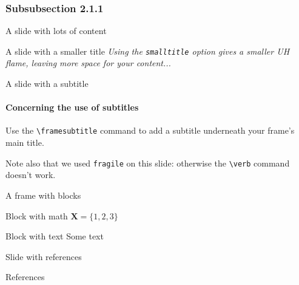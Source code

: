 \documentclass[12pt, t]{beamer}
\begin{document}
\subsubsection{Subsubsection 2.1.1}

\begin{frame}{A slide with lots of content}
    \lipsum[2]
\end{frame}

\begin{frame}[smalltitle]{A slide with a smaller title}
  \textit{Using the \texttt{smalltitle} option gives a smaller UH flame,
  leaving more space for your content...}

  \vspace{10pt}

  \lipsum[4]
\end{frame}

\begin{frame}[fragile]{A slide with a subtitle}
  \framesubtitle{Concerning the use of subtitles}

  Use the \verb#\framesubtitle# command to add a subtitle
  underneath your frame's main title.

  \vfill

  Note also that we used \verb#fragile# on this slide: otherwise
  the \verb#\verb# command doesn't work.
\end{frame}

\begin{frame}[c]{A frame with blocks}
	\begin{block}{Block with math}
		$\mathbf{X} = \{1, 2, 3\}$
	\end{block}
	\begin{block}{Block with text}
		Some text
	\end{block}
\end{frame}

\begin{frame}{Slide with references}
	\centering \cite{upper1974unsuccessful, didden2007multisite}
\end{frame}

\begin{frame}[allowframebreaks]{References}
\end{frame}
\end{document}
